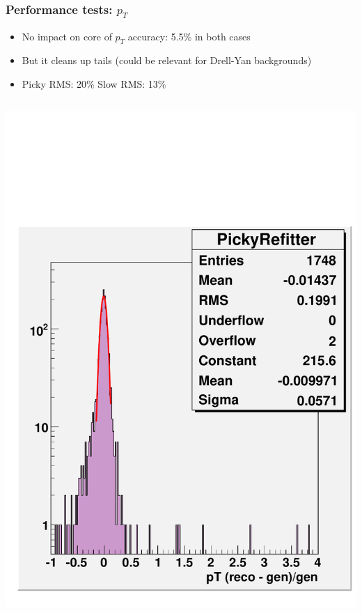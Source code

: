 \documentclass[compress]{beamer}
\begin{document}
\begin{frame}
\frametitle{Performance tests: $p_T$}

\begin{itemize}
\item No impact on core of $p_T$ accuracy: 5.5\% in both cases
\item But it cleans up tails (could be relevant for Drell-Yan backgrounds)
\item Picky RMS: 20\% \hspace{0.1 cm} Slow RMS: 13\%
\end{itemize}

\vfill
\begin{columns}
\includegraphics[width=\linewidth]{ptresolution_picky.pdf}

\end{columns}
\end{frame}
\end{document}
